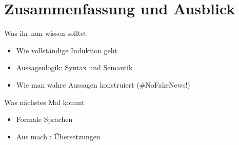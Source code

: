 

\appendix
\beginbackup

\section{Zusammenfassung und Ausblick}

\begin{frame}	
	\begin{block}{Was ihr nun wissen solltet}
		\begin{itemize}
			\item Wie vollständige Induktion geht
			\item Aussagenlogik: Syntax und Semantik
			\item Wie man wahre Aussagen konstruiert \qquad (\#NoFakeNews!) 
		\end{itemize}
	\end{block}
	
	\begin{block}{Was nächstes Mal kommt}
		\begin{itemize}
			\item Formale Sprachen
			\item Aus  mach : Übersetzungen
		\end{itemize}
	\end{block}
\end{frame}





\backupend


